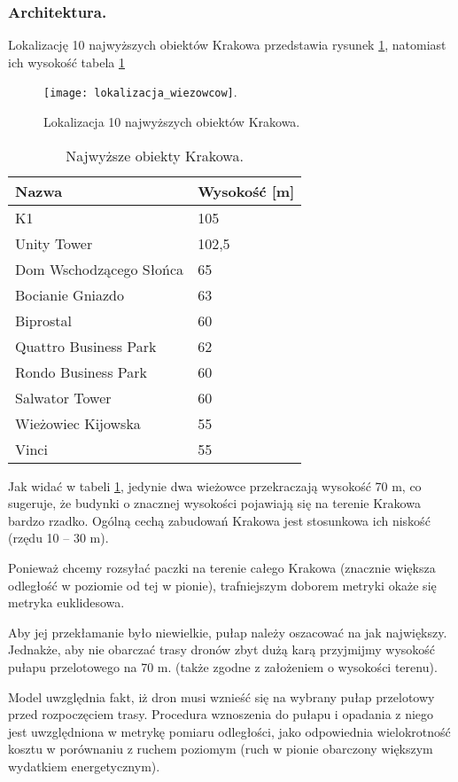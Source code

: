 \documentclass[twoside, 12pt]{article}
\begin{document}
\subsubsection{Architektura.}
\par Lokalizację 10 najwyższych obiektów Krakowa przedstawia rysunek \ref{fig:wiezowce}, natomiast ich wysokość tabela \ref{tab:wiezowce}

\begin{figure}[h]
	\centering
	\texttt{[image: lokalizacja\_wiezowcow]}.
	\caption{Lokalizacja 10 najwyższych obiektów Krakowa.\label{fig:wiezowce}}
\end{figure}

\begin{table}[h]
	\centering
	\begin{tabular}{|l|p{7cm}|}
		\hline Nazwa & Wysokość [m]\\
		\hline K1 & 105\\
		\hline Unity Tower & 102,5\\
		\hline Dom Wschodzącego Słońca & 65\\
		\hline Bocianie Gniazdo & 63\\
		\hline Biprostal & 60\\
		\hline Quattro Business Park & 62\\
		\hline Rondo Business Park & 60\\
		\hline Salwator Tower & 60\\
		\hline Wieżowiec Kijowska & 55\\
		\hline Vinci & 55\\
		\hline
	\end{tabular}
	\caption{Najwyższe obiekty Krakowa.\label{tab:wiezowce}}
\end{table}

\par Jak widać w tabeli \ref{tab:wiezowce}, jedynie dwa wieżowce przekraczają wysokość 70 m, co sugeruje, że budynki o znacznej wysokości pojawiają się na terenie Krakowa bardzo rzadko. Ogólną cechą zabudowań Krakowa jest stosunkowa ich niskość (rzędu 10 – 30 m).
\par Ponieważ chcemy rozsyłać paczki na terenie całego Krakowa (znacznie większa odległość w poziomie od tej w pionie), trafniejszym doborem metryki okaże się metryka euklidesowa.
\par Aby jej przekłamanie było niewielkie, pułap należy oszacować na jak największy. Jednakże, aby nie obarczać trasy dronów zbyt dużą karą przyjmijmy wysokość pułapu przelotowego na 70 m. (także zgodne z założeniem o wysokości terenu).
\par Model uwzględnia fakt, iż dron musi wznieść się na wybrany pułap przelotowy przed rozpoczęciem trasy. Procedura wznoszenia do pułapu i opadania z niego jest uwzględniona w metrykę pomiaru odległości, jako odpowiednia wielokrotność kosztu w porównaniu z ruchem poziomym (ruch w pionie obarczony większym wydatkiem energetycznym).
\end{document}
